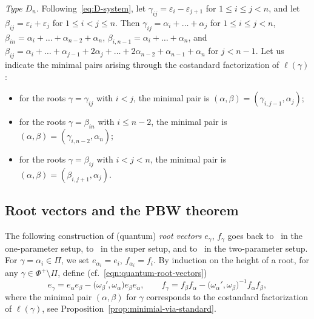 \documentclass[pdftex]{sigma}
\numberwithin{equation}{section}
\begin{document}
\emph{Type $D_n$}.
Following~\eqref{eq:D-system}, let $\gamma_{ij} = \varepsilon_{i} - \varepsilon_{j + 1}$ for $1 \le i \le j <n$, and let $\beta_{ij} = \varepsilon_{i} + \varepsilon_{j}$ for $1 \le i < j \le n$. Then $\gamma_{ij} = \alpha_{i} + \dots + \alpha_{j}$ for $1 \le i \leq j < n$, $\beta_{in} = \alpha_{i} + \dots + \alpha_{n-2} + \alpha_{n}$, $\beta_{i,n -1} = \alpha_{i} + \dots + \alpha_{n}$, and $\beta_{ij} = \alpha_{i} + \dots + \alpha_{j - 1} + 2\alpha_{j} + \dots + 2\alpha_{n-2} + \alpha_{n-1} + \alpha_{n}$ for $j < n - 1$. Let us indicate the minimal pairs arising through the costandard factorization of $\ell(\gamma)$:
\begin{itemize}\itemsep=0pt
\item
for the roots $\gamma=\gamma_{ij}$ with $i<j$, the minimal pair is $(\alpha,\beta)=(\gamma_{i,j - 1},\alpha_{j})$;

\item
for the roots $\gamma=\beta_{in}$ with $i\leq n-2$, the minimal pair is $(\alpha,\beta)=(\gamma_{i,n - 2},\alpha_{n})$;

\item
for the roots $\gamma=\beta_{ij}$ with $i < j < n$, the minimal pair is $(\alpha,\beta)=(\beta_{i,j + 1},\alpha_{j})$.
\end{itemize}

\subsection{Root vectors and the PBW theorem}\label{ssec:PBW theorem and bases}

The following construction of (quantum) \textit{root vectors} $e_{\gamma}$, $f_{\gamma}$ goes back to~\cite{K1,K2,L,Ro} in the one-parameter setup, to~\cite{CHW} in the super setup, and to~\cite{BH,BKL,HW1,HW2} in the two-parameter setup. For $\gamma=\alpha_i\in \Pi$, we set
$ e_{\alpha_i}=e_i$, $f_{\alpha_i}=f_i$.
By induction on the height of a root, for any $\gamma\in \Phi^+\setminus \Pi$, define (cf.\ \eqref{eqn:quantum-root-vectors})
\begin{equation}\label{eq:root_vector}
 e_{\gamma} = e_{\alpha}e_{\beta} - \bigl(\omega_{\beta}',\omega_{\alpha}\bigr)e_{\beta}e_{\alpha} , \qquad
 f_{\gamma} = f_{\beta}f_{\alpha} - \bigl(\omega_{\alpha}',\omega_{\beta}\bigr)^{-1}f_{\alpha}f_{\beta},
\end{equation}
where the minimal pair $(\alpha,\beta)$ for $\gamma$ corresponds to the costandard factorization of $\ell(\gamma)$, see Proposition~\ref{prop:minimial-via-standard}.
\end{document}

